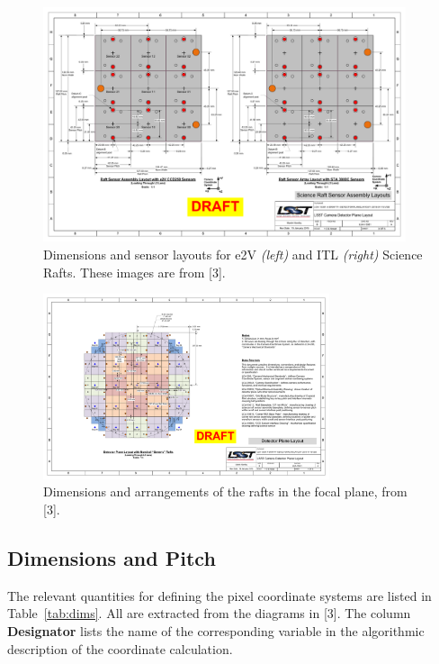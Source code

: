 \documentclass{article}[12pt]
\begin{document}
\begin{figure}
\centering
    \includegraphics[width=0.95\textwidth]{raft_layout.pdf}
    \caption{Dimensions and sensor layouts for e2V {\it (left)} and ITL {\it (right)} Science Rafts.  These images are from [3].}
    \label{fig:raft}
\end{figure}

\begin{figure}
\centering
    \includegraphics[width=0.75\textwidth]{focal_plane_layout.pdf}
    \caption{Dimensions and arrangements of the rafts in the focal plane, from [3].}
    \label{fig:focalplane}
\end{figure}

\subsection{Dimensions and Pitch}
The relevant quantities for defining the pixel coordinate systems are listed in Table~\ref{tab:dims}.  All are extracted from the diagrams in [3].  The column {\bf Designator} lists the name of the corresponding variable in the algorithmic description of the coordinate calculation.  
\end{document}
